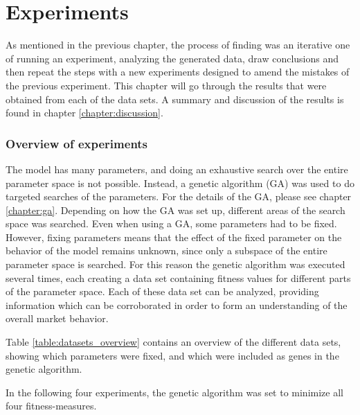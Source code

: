 \part{Experiments}\label{chapter:experiments_and_results}
As mentioned in the previous chapter, the process of finding was an iterative one of running an experiment, analyzing the generated data, draw conclusions and then repeat the steps with a new experiments designed to amend the mistakes of the previous experiment. This chapter will go through the results that were obtained from each of the data sets. A summary and discussion of the results is found in chapter \ref{chapter:discussion}.

\section{Overview of experiments}
The model has many parameters, and doing an exhaustive search over the entire parameter space is not possible. Instead, a genetic algorithm (GA) was used to do targeted searches of the parameters. For the details of the GA, please see chapter \ref{chapter:ga}. Depending on how the GA was set up, different areas of the search space was searched. Even when using a GA, some parameters had to be fixed. However, fixing parameters means that the effect of the fixed parameter on the behavior of the model remains unknown, since only a subspace of the entire parameter space is searched. For this reason the genetic algorithm was executed several times, each creating a data set containing fitness values for different parts of the parameter space. Each of these data set can be analyzed, providing information which can be corroborated in order to form an understanding of the overall market behavior.

Table \ref{table:datasets_overview} contains an overview of the different data sets, showing which parameters were fixed, and which were included as genes in the genetic algorithm.

In the following four experiments, the genetic algorithm was set to minimize all four fitness-measures.


